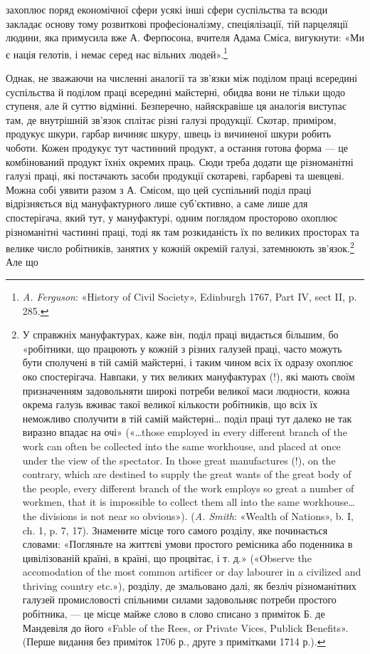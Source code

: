 \parcont{}  %
захоплює поряд економічної сфери усякі інші сфери суспільства
та всюди закладає основу тому розвиткові професіоналізму,
спеціялізації, тій парцеляції людини, яка примусила вже А. Ферґюсона,
вчителя Адама Сміса, вигукнути: «Ми є нація гелотів,
і немає серед нас вільних людей».\footnote{
\emph{A. Ferguson}: «History of Civil Society», Edinburgh 1767, Part IV,
sect II, p. 285.
}

Однак, не зважаючи на численні аналогії та зв’язки між поділом
праці всередині суспільства й поділом праці всередині майстерні,
обидва вони не тільки щодо ступеня, але й суттю відмінні.
Безперечно, найяскравіше ця аналогія виступає там, де внутрішній
зв’язок сплітає різні галузі продукції. Скотар, приміром,
продукує шкури, гарбар вичиняє шкуру, швець із вичиненої
шкури робить чоботи. Кожен продукує тут частинний продукт,
а остання готова форма — це комбінований продукт їхніх окремих
праць. Сюди треба додати ще різноманітні галузі праці, які
постачають засоби продукції скотареві, гарбареві та шевцеві.
Можна собі уявити разом з А. Смісом, що цей суспільний поділ
праці відрізняється від мануфактурного лише суб’єктивно, а саме
лише для спостерігача, який тут, у мануфактурі, одним поглядом
просторово охоплює різноманітні частинні праці, тоді як там розкиданість
їх по великих просторах та велике число робітників,
занятих у кожній окремій галузі, затемнюють зв’язок.\footnote{
У справжніх мануфактурах, каже він, поділ праці видається
більшим, бо «робітники, що працюють у кожній з різних галузей праці,
часто можуть бути сполучені в тій самій майстерні, і таким чином всіх
їх одразу охоплює око спостерігача. Навпаки, у тих великих мануфактурах
(!), які мають своїм призначенням задовольняти широкі потреби
великої маси людности, кожна окрема галузь вживає такої великої кількости
робітників, що всіх їх неможливо сполучити в тій самій майстерні\dots{}
поділ праці тут далеко не так виразно впадає на очі» («\dots{}those employed
in every different branch of the work can often be collected into the
same workhouse, and placed at once under the view of the spectator. In
those great manufactures (!), on the contrary, which are destined to supply
the great wants of the great body of the people, every different branch of
the work employs so great a number of workmen, that it is impossible
to collect them all into the same workhouse\dots{} the divisions is not near
so obvious»). (\emph{A. Smith}: «Wealth of Nations», b. I, ch. 1, p. 7, 17).
Знамените місце того самого розділу, яке починається словами:
«Погляньте на життєві умови простого ремісника або поденника в
цивілізованій країні, в країні, що процвітає, і т. д.» («Observe the accomodation
of the most common artificer or day labourer in a civilized and
thriving country etc.»), розділу, де змальовано далі, як безліч різноманітних
галузей промисловості спільними силами задовольняє потреби
простого робітника, — це місце майже слово в слово списано з приміток
Б. де Мандевіля до його «Fable of the Rees, or Private Vices, Publick Benefits».
(Перше видання без приміток 1706 р., друге з примітками 1714 р.).
} Але що

